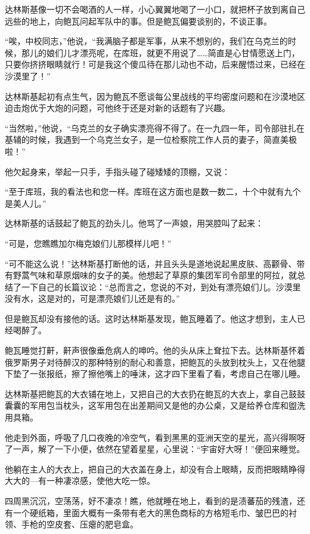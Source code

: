 达林斯基像一切不会喝酒的人一样，小心翼翼地喝了一小口，就把杯子放到离自己远些的地上，向鲍瓦问起军队中的事。但是鲍瓦偏要谈别的，不谈正事。

“唉，中校同志，”他说，“我满脑子都是军事，从来不想别的，我们在乌克兰的时候，那儿的娘们儿才漂亮呢，在库班，就更不用说了……简直是心甘情愿送上门，只要你挤挤眼睛就行！可是我这个傻瓜待在那儿动也不动，后来醒悟过来，已经在沙漠里了！”

达林斯基起初有点生气，因为鲍瓦不愿谈每公里战线的平均密度问题和在沙漠地区迫击炮优于大炮的问题，可他终于还是对新的话题有了兴趣。

“当然啦，”他说，“乌克兰的女子确实漂亮得不得了。在一九四一年，司令部驻扎在基辅的时候，我遇到一个乌克兰女子，是一位检察院工作人员的妻子，简直美极啦！”

他欠起身来，举起一只手，手指头碰了碰矮矮的顶棚，又说：

“至于库班，我的看法也和您一样。库班在这方面也是数一数二，十个中就有九个是美人儿。”

达林斯基的话鼓起了鲍瓦的劲头儿。他骂了一声娘，用哭腔叫了起来：

“可是，您瞧瞧加尔梅克娘们儿那模样儿吧！”

“可不能这么说！”达林斯基打断他的话，并且头头是道地说起黑皮肤、高颧骨、带有野蒿气味和草原烟味的女子的美。他想起了草原的集团军司令部里的阿拉，就总结了一下自己的长篇议论：“总而言之，您说的不对，到处有漂亮娘们儿。沙漠里没有水，这是对的，可是漂亮娘们儿还是有的。”

但是鲍瓦却没有接他的话。这时达林斯基发现，鲍瓦睡着了。他这才想到，主人已经喝醉了。

鲍瓦睡觉打鼾，鼾声很像垂危病人的呻吟。他的头从床上耷拉下去。达林斯基怀着俄罗斯男子对待醉汉的那种特别的耐心和善意，把鲍瓦的头放到枕头上，又在他腿下垫了一张报纸，擦了擦他嘴上的唾沫，这才四下里看了看，考虑自己在哪儿睡。

达林斯基把鲍瓦的大衣铺在地上，又把自己的大衣扔在鲍瓦的大衣上，拿自己鼓鼓囊囊的军用包当枕头，这军用包在出差期间又是他的办公桌，又是给养仓库和盥洗用具箱。

他走到外面，呼吸了几口夜晚的冷空气，看到黑黑的亚洲天空的星光，高兴得啊呀了一声，解了一下小便，依然在望着星星，心里说：“宇宙好大呀！”便回来睡觉。

他躺在主人的大衣上，把自己的大衣盖在身上，却没有合上眼睛，反而把眼睛睁得大大的—有一种凄凉感，使他大吃一惊。

四周黑沉沉，空荡荡，好不凄凉！瞧，他就睡在地上，看到的是渍蕃茄的残渣，还有一个硬纸箱，里面大概有一条带有老大的黑色商标的方格短毛巾、皱巴巴的衬领、手枪的空皮套、压瘪的肥皂盒。

